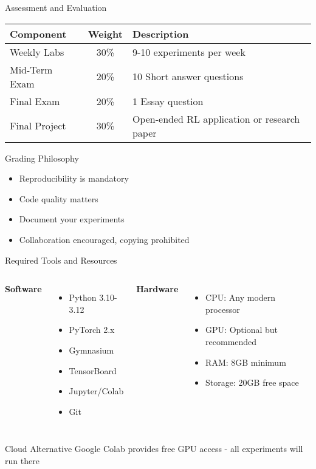 \documentclass[aspectratio=169,10pt]{beamer}
\begin{document}
\begin{frame}{Assessment and Evaluation}
\begin{table}
\centering
\begin{tabular}{|l|c|l|}
\hline
\textbf{Component} & \textbf{Weight} & \textbf{Description} \\
\hline
Weekly Labs & 30\% & 9-10 experiments per week \\
Mid-Term Exam & 20\% & 10 Short answer questions \\
Final Exam & 20\% & 1 Essay question \\
Final Project & 30\% & Open-ended RL application or research paper \\
\hline
\end{tabular}
\end{table}

\begin{block}{Grading Philosophy}
\begin{itemize}
    \item Reproducibility is mandatory
    \item Code quality matters
    \item Document your experiments
    \item Collaboration encouraged, copying prohibited
\end{itemize}
\end{block}
\end{frame}

\begin{frame}{Required Tools and Resources}
\begin{columns}
\textbf{Software}
\begin{itemize}
    \item Python 3.10-3.12
    \item PyTorch 2.x
    \item Gymnasium
    \item TensorBoard
    \item Jupyter/Colab
    \item Git
\end{itemize}

\textbf{Hardware}
\begin{itemize}
    \item CPU: Any modern processor
    \item GPU: Optional but recommended
    \item RAM: 8GB minimum
    \item Storage: 20GB free space
\end{itemize}
\end{columns}

\begin{alertblock}{Cloud Alternative}
Google Colab provides free GPU access - all experiments will run there
\end{alertblock}
\end{frame}
\end{document}

